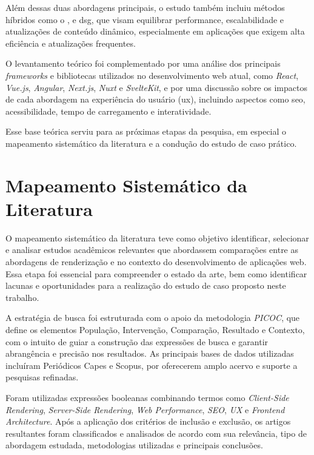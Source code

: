 Além dessas duas abordagens principais, o estudo também incluiu métodos híbridos como o ,  e {\acrfull{dsg}}, que visam equilibrar performance, escalabilidade e atualizações de conteúdo dinâmico, especialmente em aplicações que exigem alta eficiência e atualizações frequentes.

O levantamento teórico foi complementado por uma análise dos principais \textit{frameworks} e bibliotecas utilizados no desenvolvimento web atual, como \textit{React}, \textit{Vue.js}, \textit{Angular}, \textit{Next.js}, \textit{Nuxt} e \textit{SvelteKit}, e por uma discussão sobre os impactos de cada abordagem na experiência do usuário (\acrshort{ux}), incluindo aspectos como \acrshort{seo}, acessibilidade, tempo de carregamento e interatividade.

Esse base teórica serviu para as próximas etapas da pesquisa, em especial o mapeamento sistemático da literatura e a condução do estudo de caso prático.

\section{Mapeamento Sistemático da Literatura}
\label{sec:mapemento-sistematico-da-literatura}

O mapeamento sistemático da literatura teve como objetivo identificar, selecionar e analisar estudos acadêmicos relevantes que abordassem comparações entre as abordagens de renderização  e  no contexto do desenvolvimento de aplicações web. Essa etapa foi essencial para compreender o estado da arte, bem como identificar lacunas e oportunidades para a realização do estudo de caso proposto neste trabalho.

A estratégia de busca foi estruturada com o apoio da metodologia \textit{PICOC}, que define os elementos População, Intervenção, Comparação, Resultado e Contexto, com o intuito de guiar a construção das expressões de busca e garantir abrangência e precisão nos resultados. As principais bases de dados utilizadas incluíram Periódicos Capes e Scopus, por oferecerem amplo acervo e suporte a pesquisas refinadas.

Foram utilizadas expressões booleanas combinando termos como \textit{Client-Side Rendering}, \textit{Server-Side Rendering}, \textit{Web Performance}, \textit{SEO}, \textit{UX} e \textit{Frontend Architecture}. Após a aplicação dos critérios de inclusão e exclusão, os artigos resultantes foram classificados e analisados de acordo com sua relevância, tipo de abordagem estudada, metodologias utilizadas e principais conclusões.

